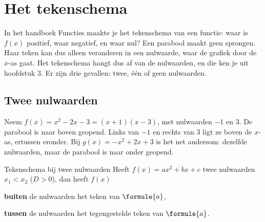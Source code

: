 \begin{oefeningen}[Start]

\end{oefeningen}

\section{Het tekenschema}

In het handboek Functies maakte je het tekenschema van een functie: waar is $f(x)$ positief, waar negatief, en waar nul? Een parabool maakt geen sprongen. Haar teken kan dus alleen veranderen in een nulwaarde, waar de grafiek door de $x$-as gaat. Het tekenschema hangt dus af van de nulwaarden, en die ken je uit hoofdstuk 3. Er zijn drie gevallen: twee, één of geen nulwaarden.

\subsection{Twee nulwaarden}

Neem $f(x) = x^2 - 2x - 3 = (x + 1)(x - 3)$, met nulwaarden $-1$ en $3$. De parabool is naar boven geopend. Links van $-1$ en rechts van $3$ ligt ze boven de $x$-as, ertussen eronder. Bij $g(x) = -x^2 + 2x + 3$ is het net andersom: dezelfde nulwaarden, maar de parabool is naar onder geopend.


\begin{theorie}
\begin{stelling}{Tekenschema bij twee nulwaarden}
Heeft $f(x) = ax^2 + bx + c$ twee nulwaarden $x_1 < x_2$ ($D > 0$), dan heeft $f(x)$

\qquad \textbf{\textcolor{accent}{buiten}} de nulwaarden het teken van $\formule{a}$,

\qquad \textbf{\textcolor{accent}{tussen}} de nulwaarden het tegengestelde teken van $\formule{a}$.
\end{stelling}
\end{theorie}

